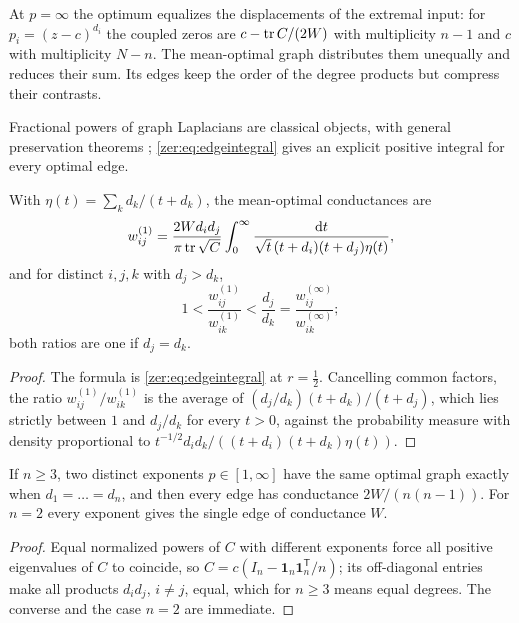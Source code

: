 At $p=\infty$ the optimum equalizes the displacements of the extremal input: for $p_i=(z-c)^{d_i}$ the
coupled zeros are $c-\operatorname{tr} C/(2W)$ with multiplicity $n-1$ and $c$ with multiplicity $N-n$. The
mean-optimal graph distributes them unequally and reduces their sum. Its edges keep the order of the
degree products but compress their contrasts.

Fractional powers of graph Laplacians are classical objects, with general preservation theorems
\cite[Theorem~3.1]{BenziSimunec2022Rational}; \eqref{zer:eq:edgeintegral} gives an explicit positive
integral for every optimal edge.

\begin{corollary}\label{zer:cor:sqrtedges}
With $\eta(t)=\sum_kd_k/(t+d_k)$, the mean-optimal conductances are
\[
 w^{(1)}_{ij}=\frac{2Wd_id_j}{\pi\operatorname{tr}\sqrt C}\int_0^\infty\frac{\mathrm{d} t}{\sqrt t\,(t+d_i)(t+d_j)\eta(t)},
\]
and for distinct $i,j,k$ with $d_j>d_k$,
\[
 1<\frac{w^{(1)}_{ij}}{w^{(1)}_{ik}}<\frac{d_j}{d_k}=\frac{w^{(\infty)}_{ij}}{w^{(\infty)}_{ik}};
\]
both ratios are one if $d_j=d_k$.
\end{corollary}
\begin{proof}
The formula is \eqref{zer:eq:edgeintegral} at $r=\tfrac12$. Cancelling common factors, the ratio
$w^{(1)}_{ij}/w^{(1)}_{ik}$ is the average of $(d_j/d_k)(t+d_k)/(t+d_j)$, which lies strictly between
$1$ and $d_j/d_k$ for every $t>0$, against the probability measure with density proportional to
$t^{-1/2}d_id_k/((t+d_i)(t+d_k)\eta(t))$.
\end{proof}

\begin{corollary}\label{zer:cor:exponents}
If $n\ge3$, two distinct exponents $p\in[1,\infty]$ have the same optimal graph exactly when
$d_1=\dots=d_n$, and then every edge has conductance $2W/(n(n-1))$. For $n=2$ every exponent gives
the single edge of conductance $W$.
\end{corollary}
\begin{proof}
Equal normalized powers of $C$ with different exponents force all positive eigenvalues of $C$ to
coincide, so $C=c(I_n-\mathbf 1_n\mathbf 1_n^{\mathsf T}/n)$; its off-diagonal entries make all
products $d_id_j$, $i\ne j$, equal, which for $n\ge3$ means equal degrees. The converse and the case
$n=2$ are immediate.
\end{proof}

